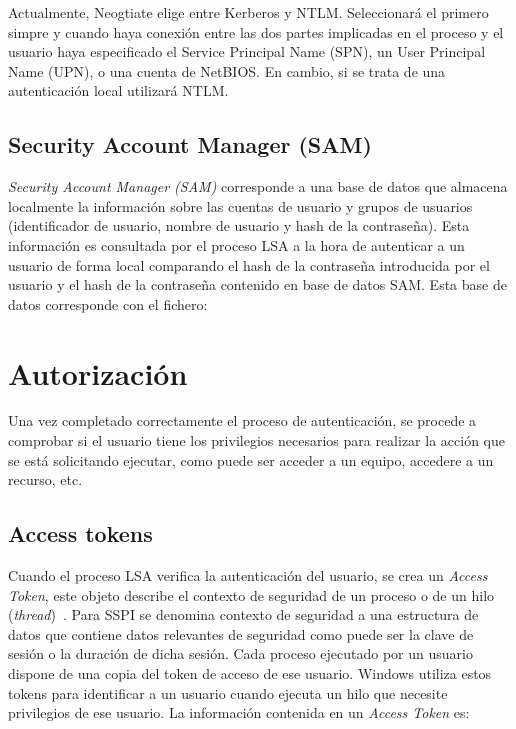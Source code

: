 Actualmente, Neogtiate elige entre Kerberos y NTLM. Seleccionará el primero simpre y cuando haya conexión entre las dos partes implicadas en el proceso y el usuario haya especificado el Service Principal Name (SPN), un User Principal Name (UPN), o una cuenta de NetBIOS. En cambio, si se trata de una autenticación local utilizará NTLM.

\subsection{Security Account Manager (SAM)}

{\it Security Account Manager (SAM)} corresponde a una base de datos que almacena localmente la información sobre las cuentas de usuario y grupos de usuarios (identificador de usuario, nombre de usuario y hash de la contraseña). Esta información es consultada por el proceso LSA a la hora de autenticar a un usuario de forma local comparando el hash de la contraseña introducida por el usuario y el hash de la contraseña contenido en base de datos SAM. Esta base de datos corresponde con el fichero: 

\begin{listing}[style=consola, numbers=none]
\end{listing}

\section{Autorización}

Una vez completado correctamente el proceso de autenticación, se procede a comprobar si el usuario tiene los privilegios necesarios para realizar la acción que se está solicitando ejecutar, como puede ser acceder a un equipo, accedere a un recurso, etc. 


\subsection{Access tokens}

Cuando el proceso LSA verifica la autenticación del usuario, se crea un {\it Access Token}, este objeto describe el contexto de seguridad de un proceso o de un hilo ({\it thread})~\cite{Capitulo2:Access-Token}. Para SSPI se denomina contexto de seguridad a una estructura de datos que contiene datos relevantes de seguridad como puede ser la clave de sesión o la duración de dicha sesión. Cada proceso ejecutado por un usuario dispone de una copia del token de acceso de ese usuario. Windows utiliza estos tokens para identificar a un usuario cuando ejecuta un hilo que necesite privilegios de ese usuario. La información contenida en un {\it Access Token} es:

